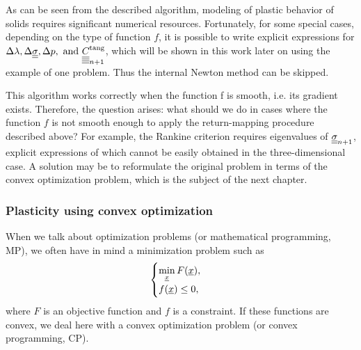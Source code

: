 \documentclass[12pt]{article}
\begin{document}
As can be seen from the described algorithm, modeling of plastic behavior of solids requires significant numerical resources. Fortunately, for some special cases, depending on the type of function $f$, it is possible to write explicit expressions for $\Delta\lambda, \Delta\underline{\underline{\sigma}}, \Delta p,  \text{ and } \underline{\underline{\underline{\underline{C_{}}}}}_{n+1}^\text{tang}$, which will be shown in this work later on using the example of one problem. Thus the internal Newton method can be skipped.



This algorithm works correctly when the function f is smooth, i.e. its gradient exists. Therefore, the question arises: what should we do in cases where the function $f$ is not smooth enough to apply the return-mapping procedure described above? For example, the Rankine criterion requires eigenvalues of $\underline{\underline{\sigma}}_{n+1}$, explicit expressions of which cannot be easily obtained in the three-dimensional case. A solution may be to reformulate the original problem in terms of the convex optimization problem, which is the subject of the next chapter.


\subsubsection{Plasticity using convex optimization}
\label{sec:theory:convex_optimization}

When we talk about optimization problems (or mathematical programming, MP), we often have in mind a minimization problem such as
\begin{equation}
    \begin{cases}
        \min\limits_{\underline{x}} F(\underline{x}),\\
        f(\underline{x}) \leq 0,
    \end{cases}
\end{equation}
where $F$ is an objective function and $f$ is a constraint. If these functions are convex, we deal here with a convex optimization problem (or convex programming, CP). 
\end{document}
